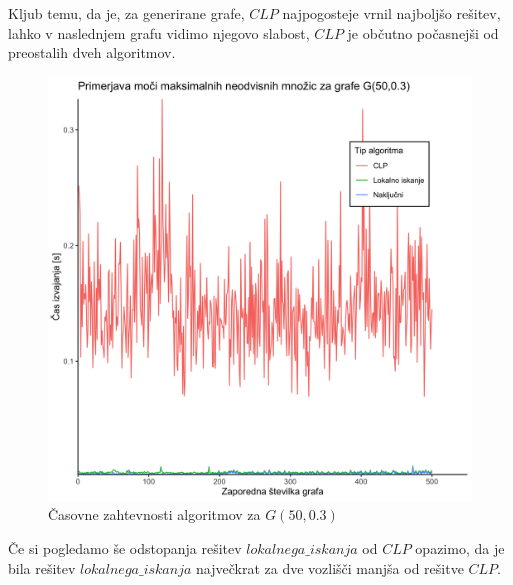 \documentclass[a4paper, 12pt]{article}
\begin{document}
Kljub temu, da je, za generirane grafe, $CLP$ najpogosteje vrnil najboljšo rešitev, lahko v naslednjem grafu vidimo njegovo slabost, $CLP$ je občutno počasnejši od preostalih dveh algoritmov. 
\begin{figure}[h!]
	\begin{center}
		\includegraphics[scale=0.12]{R_koda/pon-casi.png}
		\caption{Časovne zahtevnosti algoritmov za $G(50, 0.3)$}
	\end{center}
\end{figure}

Če si pogledamo še odstopanja rešitev $lokalnega \_ iskanja$ od $CLP$ opazimo, da je bila rešitev $lokalnega \_ iskanja$ največkrat za dve vozlišči manjša od rešitve $CLP$.
\end{document}
